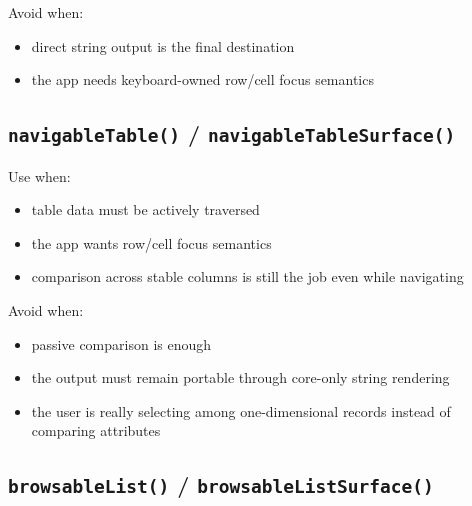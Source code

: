 Avoid when:

\begin{itemize}
\tightlist
\item
  direct string output is the final destination
\item
  the app needs keyboard-owned row/cell focus semantics
\end{itemize}

\subsection{\texorpdfstring{\texttt{n\allowbreak{}a\allowbreak{}v\allowbreak{}i\allowbreak{}g\allowbreak{}a\allowbreak{}b\allowbreak{}l\allowbreak{}e\allowbreak{}T\allowbreak{}a\allowbreak{}b\allowbreak{}l\allowbreak{}e\allowbreak{}(\allowbreak{})} / \texttt{n\allowbreak{}a\allowbreak{}v\allowbreak{}i\allowbreak{}g\allowbreak{}a\allowbreak{}b\allowbreak{}l\allowbreak{}e\allowbreak{}T\allowbreak{}a\allowbreak{}b\allowbreak{}l\allowbreak{}e\allowbreak{}S\allowbreak{}u\allowbreak{}r\allowbreak{}f\allowbreak{}a\allowbreak{}c\allowbreak{}e\allowbreak{}(\allowbreak{})}}{ / }}\label{record-023-navigabletable-navigabletablesurface}

Use when:

\begin{itemize}
\tightlist
\item
  table data must be actively traversed
\item
  the app wants row/cell focus semantics
\item
  comparison across stable columns is still the job even while navigating
\end{itemize}

Avoid when:

\begin{itemize}
\tightlist
\item
  passive comparison is enough
\item
  the output must remain portable through core-only string rendering
\item
  the user is really selecting among one-dimensional records instead of comparing attributes
\end{itemize}

\subsection{\texorpdfstring{\texttt{b\allowbreak{}r\allowbreak{}o\allowbreak{}w\allowbreak{}s\allowbreak{}a\allowbreak{}b\allowbreak{}l\allowbreak{}e\allowbreak{}L\allowbreak{}i\allowbreak{}s\allowbreak{}t\allowbreak{}(\allowbreak{})} / \texttt{b\allowbreak{}r\allowbreak{}o\allowbreak{}w\allowbreak{}s\allowbreak{}a\allowbreak{}b\allowbreak{}l\allowbreak{}e\allowbreak{}L\allowbreak{}i\allowbreak{}s\allowbreak{}t\allowbreak{}S\allowbreak{}u\allowbreak{}r\allowbreak{}f\allowbreak{}a\allowbreak{}c\allowbreak{}e\allowbreak{}(\allowbreak{})}}{ / }}\label{record-023-browsablelist-browsablelistsurface}


